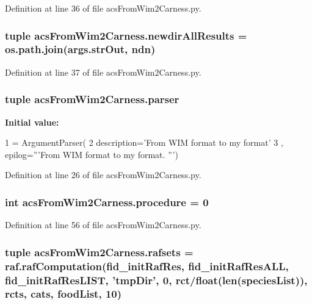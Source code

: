 Definition at line 36 of file acs\-From\-Wim2\-Carness.\-py.

\hypertarget{a00100_a4af2fb5abbd4a6e8930401e66af5b79d}{
\subsubsection[{newdir\-All\-Results}]{\setlength{\rightskip}{0pt plus 5cm}tuple acs\-From\-Wim2\-Carness.\-newdir\-All\-Results = os.\-path.\-join(args.\-str\-Out, {\bf ndn})}}\label{a00100_a4af2fb5abbd4a6e8930401e66af5b79d}


Definition at line 37 of file acs\-From\-Wim2\-Carness.\-py.

\hypertarget{a00100_aed93287ef2c9a4a9ba68f8ffc75aae17}{
\subsubsection[{parser}]{\setlength{\rightskip}{0pt plus 5cm}tuple acs\-From\-Wim2\-Carness.\-parser}}\label{a00100_aed93287ef2c9a4a9ba68f8ffc75aae17}
{\bfseries Initial value\-:}
\begin{DoxyCode}
1 = ArgumentParser(
2                                 description=\textcolor{stringliteral}{'From WIM format to my format'}
3                                 , epilog=\textcolor{stringliteral}{'''From WIM format to my format. '''})
\end{DoxyCode}


Definition at line 26 of file acs\-From\-Wim2\-Carness.\-py.

\hypertarget{a00100_ac84174dad0b933ca88ebdb79cf3497ec}{
\subsubsection[{procedure}]{\setlength{\rightskip}{0pt plus 5cm}int acs\-From\-Wim2\-Carness.\-procedure = 0}}\label{a00100_ac84174dad0b933ca88ebdb79cf3497ec}


Definition at line 56 of file acs\-From\-Wim2\-Carness.\-py.

\hypertarget{a00100_a36370edf2a6a4e19f0a99413aac43096}{
\subsubsection[{rafsets}]{\setlength{\rightskip}{0pt plus 5cm}tuple acs\-From\-Wim2\-Carness.\-rafsets = raf.\-raf\-Computation({\bf fid\-\_\-init\-Raf\-Res}, {\bf fid\-\_\-init\-Raf\-Res\-A\-L\-L}, {\bf fid\-\_\-init\-Raf\-Res\-L\-I\-S\-T}, 'tmp\-Dir', 0, {\bf rct}/float(len({\bf species\-List})), rcts, {\bf cats}, {\bf food\-List}, 10)}}\label{a00100_a36370edf2a6a4e19f0a99413aac43096}


